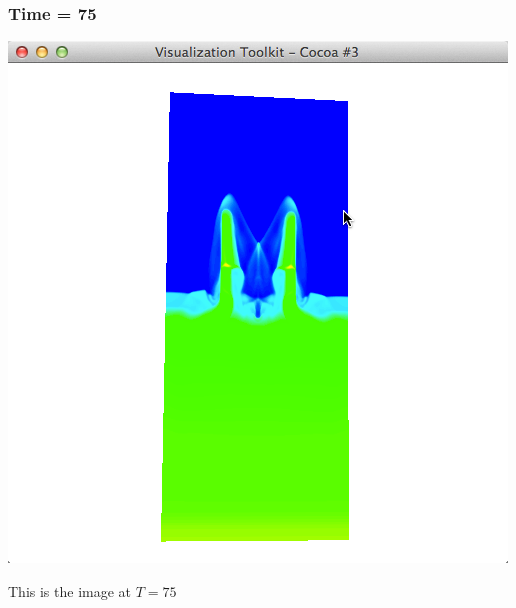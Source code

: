 \documentclass[11pt]{scrartcl}
\begin{document}
\subsubsection{Time = 75}
\begin{minipage}[t]{\linewidth}
{
\includegraphics[scale = 0.5]{img_2_75.png}

\centering
\medskip
{\footnotesize This is the image at $T = 75$}
}
\end{minipage}
\end{document}

